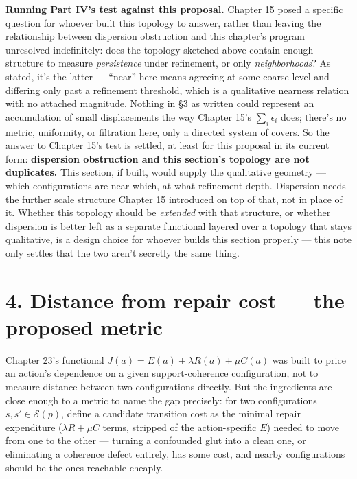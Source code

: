 \textbf{Running Part IV's test against this proposal.} Chapter 15 posed a
specific question for whoever built this topology to answer, rather than
leaving the relationship between dispersion obstruction and this
chapter's program unresolved indefinitely: does the topology sketched
above contain enough structure to measure \emph{persistence} under
refinement, or only \emph{neighborhoods}? As stated, it's the latter --- ``near''
here means agreeing at some coarse level and differing only past a
refinement threshold, which is a qualitative nearness relation with no
attached magnitude. Nothing in §3 as written could represent an
accumulation of small displacements the way Chapter 15's
\(\sum_i \epsilon_i\) does; there's no metric, uniformity, or filtration
here, only a directed system of covers. So the answer to Chapter 15's
test is settled, at least for this proposal in its current form:
\textbf{dispersion obstruction and this section's topology are not
duplicates.} This section, if built, would supply the qualitative
geometry --- which configurations are near which, at what refinement
depth. Dispersion needs the further scale structure Chapter 15
introduced on top of that, not in place of it. Whether this topology
should be \emph{extended} with that structure, or whether dispersion is
better left as a separate functional layered over a topology that stays
qualitative, is a design choice for whoever builds this section
properly --- this note only settles that the two aren't secretly the same
thing.

\hypertarget{distance-from-repair-cost-the-proposed-metric}{%
\section{4. Distance from repair cost --- the proposed metric}\label{distance-from-repair-cost-the-proposed-metric}}

Chapter 23's functional \(J(a) = E(a) + \lambda R(a) + \mu C(a)\) was built
to price an action's dependence on a given support-coherence
configuration, not to measure distance between two configurations
directly. But the ingredients are close enough to a metric to name the
gap precisely: for two configurations \(s, s' \in \mathcal{S}(p)\), define
a candidate transition cost as the minimal repair expenditure
(\(\lambda R + \mu C\) terms, stripped of the action-specific \(E\)) needed
to move from one to the other --- turning a confounded glut into a clean
one, or eliminating a coherence defect entirely, has some cost, and nearby
configurations should be the ones reachable cheaply.

